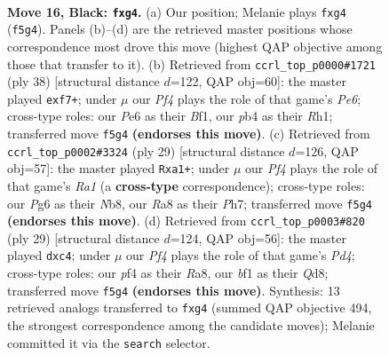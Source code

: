 \documentclass[11pt]{article}
\begin{document}
\begin{figure}[p]
\label{fig:thought-m29}
\end{figure}

\clearpage

\begin{figure}[p]\centering
\begin{subfigure}{0.46\textwidth}\centering
\resizebox{\linewidth}{!}{%
\newchessgame
\chessboard[
  setfen={rnb2rk1/ppp5/1n2p1p1/3pPp2/PP1P1PP1/1PN5/8/3QKBNR b K - 0 16},
  showmover=false,
  pgfstyle=straightmove, color=movearrow, markmove={f5-g4}
]}
\caption{}
\end{subfigure}\hfill
\begin{subfigure}{0.46\textwidth}\centering
\resizebox{\linewidth}{!}{%
\newchessgame
\chessboard[
  setfen={2r1nrk1/p3pp1p/4P1p1/q1p5/1p2P3/1Pb1BNN1/P1P3PP/1K1R1B1R w - - 0 20},
  showmover=false,
  pgfstyle=straightmove, color=movearrow, markmove={e6-f7}
]}
\caption{}
\end{subfigure}
\\[4pt]
\begin{subfigure}{0.46\textwidth}\centering
\resizebox{\linewidth}{!}{%
\newchessgame
\chessboard[
  setfen={rn3rk1/4ppbp/3p1np1/1PpP4/4P3/5N2/1PQB1PPP/R3K2R b KQ - 0 15},
  showmover=false,
  pgfstyle=straightmove, color=movearrow, markmove={a8-a1}
]}
\caption{}
\end{subfigure}\hfill
\begin{subfigure}{0.46\textwidth}\centering
\resizebox{\linewidth}{!}{%
\newchessgame
\chessboard[
  setfen={r1bq1rk1/pp1n1p2/4p2p/3p2p1/2PP4/P2B1NP1/1P3PP1/R1Q1K2R b KQ - 0 15},
  showmover=false,
  pgfstyle=straightmove, color=movearrow, markmove={d5-c4}
]}
\caption{}
\end{subfigure}
\caption{\textbf{Move 16, Black: \texttt{fxg4}.} (a) Our position; Melanie plays \texttt{fxg4} (\texttt{f5g4}). Panels (b)--(d) are the retrieved master positions whose correspondence most drove this move (highest QAP objective among those that transfer to it). (b) Retrieved from \texttt{ccrl\_top\_p0000\#1721} (ply 38) [structural distance $d$=122, QAP obj=60]: the master played \texttt{exf7+}; under $\mu$ our \emph{Pf4} plays the role of that game's \emph{Pe6}; cross-type roles: our \emph{P}e6 as their \emph{B}f1, our \emph{p}b4 as their \emph{R}h1; transferred move \texttt{f5g4} \textbf{(endorses this move)}. (c) Retrieved from \texttt{ccrl\_top\_p0002\#3324} (ply 29) [structural distance $d$=126, QAP obj=57]: the master played \texttt{Rxa1+}; under $\mu$ our \emph{Pf4} plays the role of that game's \emph{Ra1} (a \textbf{cross-type} correspondence); cross-type roles: our \emph{P}g6 as their \emph{N}b8, our \emph{R}a8 as their \emph{P}h7; transferred move \texttt{f5g4} \textbf{(endorses this move)}. (d) Retrieved from \texttt{ccrl\_top\_p0003\#820} (ply 29) [structural distance $d$=124, QAP obj=56]: the master played \texttt{dxc4}; under $\mu$ our \emph{Pf4} plays the role of that game's \emph{Pd4}; cross-type roles: our \emph{p}f4 as their \emph{R}a8, our \emph{b}f1 as their \emph{Q}d8; transferred move \texttt{f5g4} \textbf{(endorses this move)}. Synthesis: 13 retrieved analogs transferred to \texttt{fxg4} (summed QAP objective 494, the strongest correspondence among the candidate moves); Melanie committed it via the \texttt{search} selector.}

\end{figure}
\end{document}
